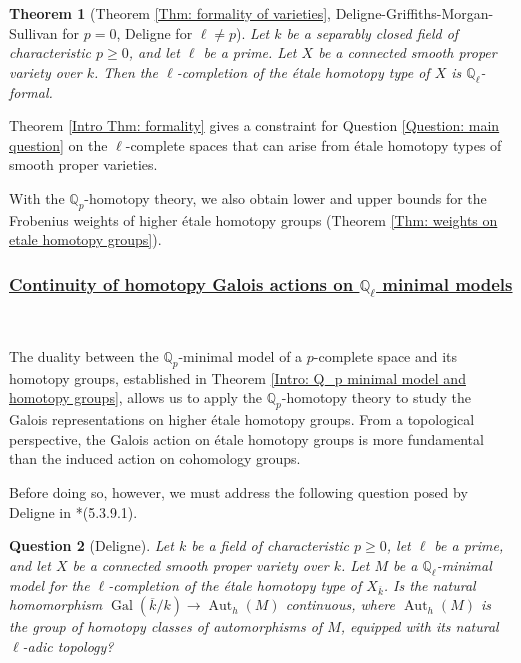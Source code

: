 \documentclass[11pt]{amsart}
\newtheorem{theorem}{Theorem}[section]
\newtheorem{question}[theorem]{Question}
\theoremstyle{definition}
\numberwithin{equation}{section}
\numberwithin{equation}{section}
\newcommand\QQ{\mathbb{Q}}
\DeclareMathOperator{\Aut}{Aut}
\DeclareMathOperator{\Gal}{Gal}
\begin{document}
\begin{theorem}[Theorem \ref{Thm: formality of varieties}, Deligne-Griffiths-Morgan-Sullivan for $p=0$, Deligne for $\ell\neq p$]\label{Thm: formality in Introduction}\label{Intro Thm: formality}
Let $k$ be a separably closed field of characteristic $p\geq 0$, and let $\ell$ be a prime. Let $X$ be a connected smooth proper variety over $k$. Then the $\ell$-completion of the \'etale homotopy type of $X$ is $\QQ_{\ell}$-formal.    
\end{theorem}

Theorem \ref{Intro Thm: formality} gives a constraint for Question \ref{Question: main question} on the $\ell$-complete spaces that can arise from \'etale homotopy types of smooth proper varieties.

With the $\QQ_{p}$-homotopy theory, we also obtain lower and upper bounds for the Frobenius weights of higher \'etale homotopy groups (Theorem \ref{Thm: weights on etale homotopy groups}).

\subsubsection*{\underline{Continuity of homotopy Galois actions on $\QQ_{\ell}$ minimal models}}\,

The duality between the $\QQ_p$-minimal model of a $p$-complete space and its homotopy groups, established in Theorem \ref{Intro: Q_p minimal model and homotopy groups}, allows us to apply the $\QQ_p$-homotopy theory to study the Galois representations on higher \'etale homotopy groups. From a topological perspective, the Galois action on \'etale homotopy groups is more fundamental than the induced action on cohomology groups. 

Before doing so, however, we must address the following question posed by Deligne in \cite{Deligne-Weil-II}*{(5.3.9.1)}.

\begin{question}[Deligne]\label{Question: Deligne}
Let $k$ be a field of characteristic $p\geq 0$, let $\ell$ be a prime, and let $X$ be a connected smooth proper variety over $k$. Let $M$ be a $\QQ_{\ell}$-minimal model for the $\ell$-completion of the \'etale homotopy type of $X_{\overline{k}}$. 
Is the natural homomorphism $\Gal(\overline{k}/k)\rightarrow \Aut_h(M)$ continuous, where $\Aut_h(M)$ is the group of homotopy classes of automorphisms of $M$, equipped with its natural $\ell$-adic topology?
\end{question}
\end{document}
